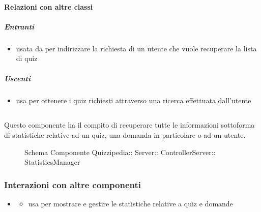 \paragraph{Relazioni con altre classi}
\subparagraph{Entranti}
\begin{itemize}
\item usata da  per indirizzare la richiesta di un utente che vuole recuperare la lista di quiz
\end{itemize}
\subparagraph{Uscenti}
\begin{itemize}
\item usa  per ottenere i quiz richiesti attraverso una ricerca effettuata dall'utente
\end{itemize}
\subsection{}
Questo componente ha il compito di recuperare tutte le informazioni sottoforma di statistiche relative ad un quiz, una domanda in particolare o ad un utente.
\begin{figure}[H]
\centering
\noindent{}
\caption[Schema Componente StatisticsManager]{Schema Componente Quizzipedia:: Server:: ControllerServer:: StatisticsManager}
\end{figure}
\subsubsection{Interazioni con altre componenti}
\begin{itemize}
\item {}
\begin{itemize}
\item usa  per mostrare e gestire le statistiche relative a quiz e domande
\end{itemize}
\end{itemize}
